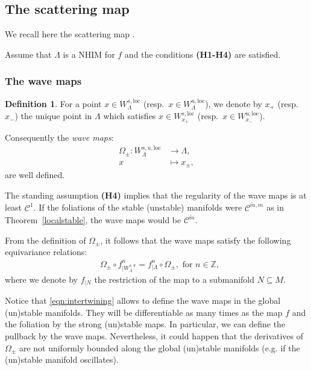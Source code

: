 \documentclass[11pt]{amsart}
\theoremstyle{definition}
\newtheorem{defn}[thm]{Definition}
\theoremstyle{remark}
\numberwithin{equation}{section}
\newcommand{\Z}{\mathbb Z}
\newcommand{\C}{\mathcal{C}}
\begin{document}
\subsection{The scattering map}
\label{sec:SM}
We recall here the scattering map \cite{DLS00, DLS08}.


Assume that $\Lambda$ is a NHIM for $f$ and the conditions  \textbf{(H1-H4)} are satisfied.



\subsubsection{The wave maps}

\begin{defn}\label{wavemap}
For a point $x\in W_\Lambda^{s,\textrm{loc}}$ (resp.\ $x\in W_\Lambda^{u,\textrm{loc}}$), we
denote by $x_+$ (resp.\ $x_-$) the unique point in $\Lambda$ which satisfies $x\in W_{x_+}^{s,\textrm{loc}}$ (resp.\ $x\in W_{x_-}^{u,\textrm{loc}}$).

Consequently the \emph{wave maps}:
\begin{equation}  \label{waveoperators}
\begin{split}
\Omega_{\pm} :W_{\Lambda}^{s,u, \textrm{loc}} & \longrightarrow \Lambda, \\
x & \mapsto x_{\pm},
\end{split}
\end{equation}
are well defined.

\end{defn}

The standing assumption   \textbf{(H4)} implies that the regularity
of the wave maps is at least $\C^1$.
If the foliations of the stable (unstable) manifolds were
$\C^{\tilde m, m}$ as in Theorem~\ref{localstable},
the wave maps would be $\C^{\tilde m}$.



From the definition of $\Omega_\pm$, it follows that the wave maps satisfy the following equivariance relations:
\begin{equation}\label{eqn:intertwining}
  \begin{split}
&\Omega_\pm \circ f^n_{\mid W^{s,u}_\Lambda}=f_{\mid\Lambda}^n\circ \Omega_\pm, \textrm{ for }n\in \Z,
\end{split}
\end{equation}
 where we denote by $f_{\mid N}$ the restriction of the map to a submanifold $N\subseteq M$.

 Notice that \eqref{eqn:intertwining} allows to define  the
 wave maps in the global (un)stable manifolds.
 They will be differentiable as many times as the map $f$ and  the foliation by the strong (un)stable maps.
 In particular, we can define the pullback by the wave maps.
 Nevertheless, it could  happen that  the derivatives of $\Omega_\pm$  are not
 uniformly bounded along the global (un)stable manifolds
 (e.g. if the (un)stable manifold oscillates).
\end{document}
